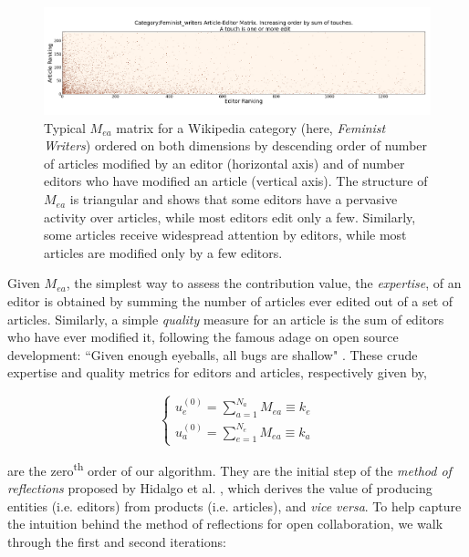 \begin{figure}[!t]
\centering
\includegraphics[width=2.0\columnwidth]{../Figures/Category_Feminist_writerstriangle_matrix_corrected.png}
\caption{Typical $\mathbf{\mathit{M_{ea}}}$ matrix for a Wikipedia category (here, {\it Feminist Writers}) ordered on both dimensions by descending order of number of articles modified by an editor (horizontal axis) and of number editors who have modified an article (vertical axis). The structure of $\mathbf{\mathit{M_{ea}}}$ is triangular and shows that some editors have a pervasive activity over articles, while most editors edit only a few. Similarly, some articles receive widespread attention by editors, while most articles are modified only by a few editors.}
\label{fig:triangle}
\end{figure}


Given $M_{ea}$, the simplest way to assess the contribution value, the {\it expertise}, of an editor is obtained by summing the number of articles ever edited out of a set of articles. Similarly, a simple {\it quality} measure for an article is the sum of editors who have ever modified it, following the famous adage on open source development: ``Given enough eyeballs, all bugs are shallow" \cite{raymond1999}. These crude expertise and quality metrics for editors and articles, respectively  given by,

\begin{equation}
\begin{cases}
 u_{e}^{(0)} = \sum_{a=1}^{N_{a}} M_{ea} \equiv k_e\\[7pt]
 u_{a}^{(0)} = \sum_{e=1}^{N_{e}} M_{ea} \equiv k_a
\end{cases}
\label{HHinit}
\end{equation}

are the zero\textsuperscript{th} order of our algorithm. They are the initial step of the {\it method of reflections} proposed by Hidalgo et al. \cite{hidalgo2007,hidalgo2009}, which derives the value of producing entities (i.e. editors) from products (i.e. articles), and {\it vice versa}. To help capture the intuition behind the method of reflections for open collaboration, we walk through the first and second iterations:

